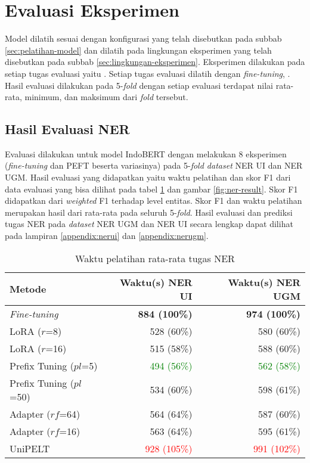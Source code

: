 \section{Evaluasi Eksperimen}

Model dilatih sesuai dengan konfigurasi yang telah disebutkan pada subbab \ref{sec:pelatihan-model} dan dilatih pada lingkungan eksperimen yang telah disebutkan pada subbab \ref{sec:lingkungan-eksperimen}. Eksperimen dilakukan pada setiap tugas evaluasi yaitu \nlptask. Setiap tugas evaluasi dilatih dengan \textit{fine-tuning}, \methodPEFT. Hasil evaluasi dilakukan pada 5-\textit{fold} dengan setiap evaluasi terdapat nilai rata-rata, minimum, dan maksimum dari \textit{fold} tersebut.

\subsection{Hasil Evaluasi NER}
\label{sec:ner-evaluation}

Evaluasi dilakukan untuk model IndoBERT dengan melakukan 8 eksperimen (\textit{fine-tuning} dan PEFT beserta variasinya) pada 5-\textit{fold dataset} NER UI dan NER UGM. Hasil evaluasi yang didapatkan yaitu waktu pelatihan dan skor F1 dari data evaluasi yang bisa dilihat pada tabel \ref{table:runtime-ner} dan gambar \ref{fig:ner-result}. Skor F1 didapatkan dari \textit{weighted} F1 terhadap level entitas. Skor F1 dan waktu pelatihan merupakan hasil dari rata-rata pada seluruh 5-\textit{fold}. Hasil evaluasi dan prediksi tugas NER pada \textit{dataset} NER UGM dan NER UI secara lengkap dapat dilihat pada lampiran \ref{appendix:nerui} dan \ref{appendix:nerugm}.

\begin{table}[h]
    \centering
    \caption{Waktu pelatihan rata-rata tugas NER}
    \label{table:runtime-ner}
    \begin{tabular}{l|r|r}
        \toprule
        \textbf{Metode} & \textbf{Waktu(s) NER UI} & \textbf{Waktu(s) NER UGM} \\
        \midrule
        \textit{Fine-tuning} & \textbf{884 (100\%)} & \textbf{974 (100\%)} \\
        LoRA ($r$=8) & 528 (60\%) & 580 (60\%) \\
        LoRA ($r$=16) & 515 (58\%) & 588 (60\%) \\
        Prefix Tuning ($pl$=5) & \textcolor{Green}{494 (56\%)} & \textcolor{Green}{562 (58\%)} \\
        Prefix Tuning ($pl$=50) & 534 (60\%) & 598 (61\%) \\
        Adapter ($rf$=64) & 564 (64\%) & 587 (60\%) \\
        Adapter ($rf$=16) & 563 (64\%) & 595 (61\%) \\
        UniPELT & \textcolor{Red}{928 (105\%)} & \textcolor{Red}{991 (102\%)} \\
        \bottomrule
    \end{tabular}
\end{table}

